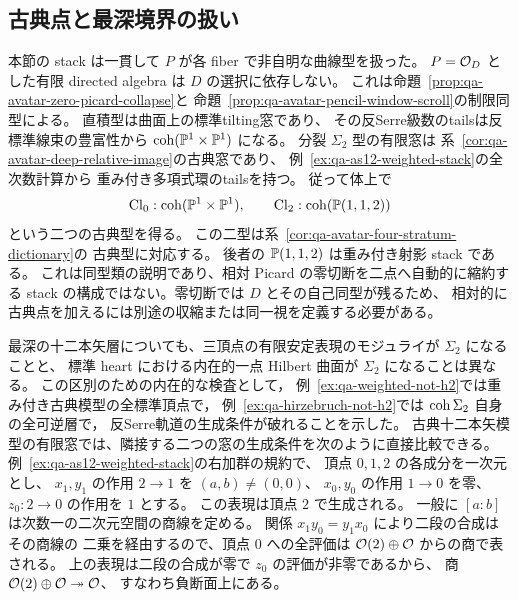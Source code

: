 \subsection{古典点と最深境界の扱い}

本節の stack は一貫して $P$ が各 fiber で非自明な曲線型を扱った。
$P=\mathcal O_D$ とした有限 directed algebra は $D$ の選択に依存しない。
これは命題~\ref{prop:qa-avatar-zero-picard-collapse}と
命題~\ref{prop:qa-avatar-pencil-window-scroll}の制限同型による。
直積型は曲面上の標準tilting窓であり、
その反Serre級数のtailsは反標準線束の豊富性から
$\operatorname{coh}(\mathbb P^1\times\mathbb P^1)$ になる。
分裂 $\Sigma _2$ 型の有限窓は
系~\ref{cor:qa-avatar-deep-relative-image}の古典窓であり、
例~\ref{ex:qa-as12-weighted-stack}の全次数計算から
重み付き多項式環のtailsを持つ。
従って体上で
\[
 \mathrm{Cl}_0:\operatorname{coh}(\mathbb P^1\times\mathbb P^1),\qquad
 \mathrm{Cl}_2:\operatorname{coh}(\mathbb P(1,1,2))
\]
という二つの古典型を得る。
この二型は系~\ref{cor:qa-avatar-four-stratum-dictionary}の
古典型に対応する。
後者の $\mathbb P(1,1,2)$ は重み付き射影 stack である。
これは同型類の説明であり、相対 Picard の零切断を二点へ自動的に縮約する
stack の構成ではない。零切断では $D$ とその自己同型が残るため、
相対的に古典点を加えるには別途の収縮または同一視を定義する必要がある。

最深の十二本矢層についても、三頂点の有限安定表現のモジュライが $\Sigma _2$ になることと、
標準 heart における内在的一点 Hilbert 曲面が $\Sigma _2$ になることは異なる。
この区別のための内在的な検査として，
例~\ref{ex:qa-weighted-not-h2}では重み付き古典模型の全標準頂点で，
例~\ref{ex:qa-hirzebruch-not-h2}では $\operatorname{coh}\Sigma_2$ 自身の全可逆層で，
反Serre軌道の生成条件が破れることを示した。
古典十二本矢模型の有限窓では、隣接する二つの窓の生成条件を次のように直接比較できる。
例~\ref{ex:qa-as12-weighted-stack}の右加群の規約で、
頂点 $0,1,2$ の各成分を一次元とし、
$x_1,y_1$ の作用 $2\to1$ を $(a,b)\ne(0,0)$、
$x_0,y_0$ の作用 $1\to0$ を零、$z_0:2\to0$ の作用を $1$ とする。
この表現は頂点 $2$ で生成される。
一般に $[a:b]$ は次数一の二次元空間の商線を定める。
関係 $x_1y_0=y_1x_0$ により二段の合成はその商線の
二乗を経由するので、頂点 $0$ への全評価は
$\mathcal O(2)\oplus\mathcal O$ からの商で表される。
上の表現は二段の合成が零で $z_0$ の評価が非零であるから、
商 $\mathcal O(2)\oplus\mathcal O\twoheadrightarrow\mathcal O$、
すなわち負断面上にある。

